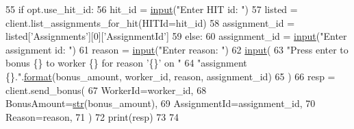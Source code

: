 \begin{DoxyCode}
55         \textcolor{keywordflow}{if} opt.use\_hit\_id:
56             hit\_id = \hyperlink{namespaceparlai_1_1mturk_1_1core_1_1dev_1_1test_1_1test__full__system_a1e1817cd65688fb90f827834d1fb4567}{input}(\textcolor{stringliteral}{"Enter HIT id: "})
57             listed = client.list\_assignments\_for\_hit(HITId=hit\_id)
58             assignment\_id = listed[\textcolor{stringliteral}{'Assignments'}][0][\textcolor{stringliteral}{'AssignmentId'}]
59         \textcolor{keywordflow}{else}:
60             assignment\_id = \hyperlink{namespaceparlai_1_1mturk_1_1core_1_1dev_1_1test_1_1test__full__system_a1e1817cd65688fb90f827834d1fb4567}{input}(\textcolor{stringliteral}{"Enter assignment id: "})
61         reason = \hyperlink{namespaceparlai_1_1mturk_1_1core_1_1dev_1_1test_1_1test__full__system_a1e1817cd65688fb90f827834d1fb4567}{input}(\textcolor{stringliteral}{"Enter reason: "})
62         \hyperlink{namespaceparlai_1_1mturk_1_1core_1_1dev_1_1test_1_1test__full__system_a1e1817cd65688fb90f827834d1fb4567}{input}(
63             \textcolor{stringliteral}{"Press enter to bonus \{\} to worker \{\} for reason '\{\}' on "}
64             \textcolor{stringliteral}{"assignment \{\}."}.\hyperlink{namespaceparlai_1_1chat__service_1_1services_1_1messenger_1_1shared__utils_a32e2e2022b824fbaf80c747160b52a76}{format}(bonus\_amount, worker\_id, reason, assignment\_id)
65         )
66         resp = client.send\_bonus(
67             WorkerId=worker\_id,
68             BonusAmount=\hyperlink{namespacegenerate__task__READMEs_a5b88452ffb87b78c8c85ececebafc09f}{str}(bonus\_amount),
69             AssignmentId=assignment\_id,
70             Reason=reason,
71         )
72         print(resp)
73 
74 
\end{DoxyCode}
